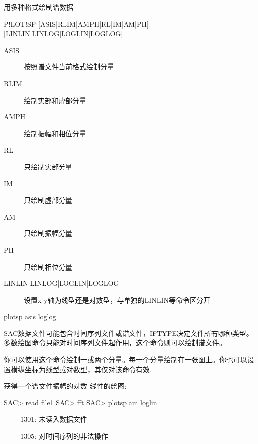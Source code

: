 \label{cmd:plotsp}

用多种格式绘制谱数据

\begin{SACSTX}
P!LOT!SP [ASIS|RLIM|AMPH|RL|IM|AM|PH] [LINLIN|LINLOG|LOGLIN|LOGLOG]
\end{SACSTX}

\begin{description}
\item [ASIS]  按照谱文件当前格式绘制分量
\item [RLIM]  绘制实部和虚部分量 
\item [AMPH]  绘制振幅和相位分量 
\item [RL] 只绘制实部分量 
\item [IM]  只绘制虚部分量 
\item [AM]  只绘制振幅分量 
\item [PH]  只绘制相位分量 
\item [LINLIN|LINLOG|LOGLIN|LOGLOG] 设置x-y轴为线型还是对数型，与单独的LINLIN等命令区分开
\end{description}

\begin{SACDFT}
plotsp asis loglog
\end{SACDFT}

SAC数据文件可能包含时间序列文件或谱文件，IFTYPE决定文件所有哪种类型。多数绘图命令只能对时间序列文件起作用，这个命令则可以绘制谱文件。

你可以使用这个命令绘制一或两个分量。每一个分量绘制在一张图上。你也可以设置横纵坐标为线型或对数型，其仅对该命令有效.

获得一个谱文件振幅的对数-线性的绘图:
\begin{SACCode}
SAC> read file1
SAC> fft
SAC> plotsp am loglin
\end{SACCode}

\begin{itemize}
\item[-]1301: 未读入数据文件
\item[-]1305: 对时间序列的非法操作
\end{itemize}
